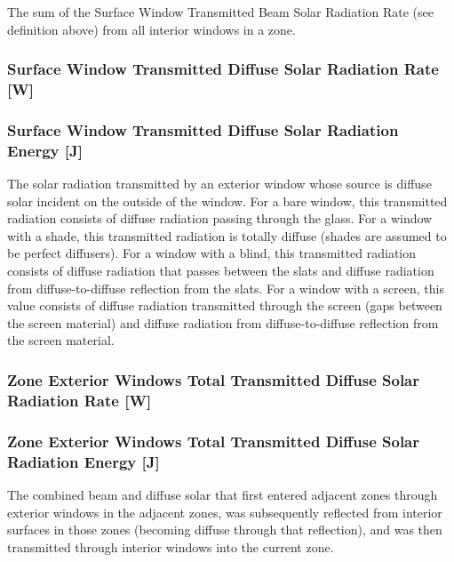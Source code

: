 The sum of the Surface Window Transmitted Beam Solar Radiation Rate (see definition above) from all interior windows in a zone.

\subsubsection{Surface Window Transmitted Diffuse Solar Radiation Rate {[}W{]}}\label{surface-window-transmitted-diffuse-solar-radiation-rate-w}

\subsubsection{Surface Window Transmitted Diffuse Solar Radiation Energy {[}J{]}}\label{surface-window-transmitted-diffuse-solar-radiation-energy-j}

The solar radiation transmitted by an exterior window whose source is diffuse solar incident on the outside of the window. For a bare window, this transmitted radiation consists of diffuse radiation passing through the glass. For a window with a shade, this transmitted radiation is totally diffuse (shades are assumed to be perfect diffusers). For a window with a blind, this transmitted radiation consists of diffuse radiation that passes between the slats and diffuse radiation from diffuse-to-diffuse reflection from the slats. For a window with a screen, this value consists of diffuse radiation transmitted through the screen (gaps between the screen material) and diffuse radiation from diffuse-to-diffuse reflection from the screen material.

\subsubsection{Zone Exterior Windows Total Transmitted Diffuse Solar Radiation Rate {[}W{]}}\label{zone-exterior-windows-total-transmitted-diffuse-solar-radiation-rate-w}

\subsubsection{Zone Exterior Windows Total Transmitted Diffuse Solar Radiation Energy {[}J{]}}\label{zone-exterior-windows-total-transmitted-diffuse-solar-radiation-energy-j}

The combined beam and diffuse solar that first entered adjacent zones through exterior windows in the adjacent zones, was subsequently reflected from interior surfaces in those zones (becoming diffuse through that reflection), and was then transmitted through interior windows into the current zone.

